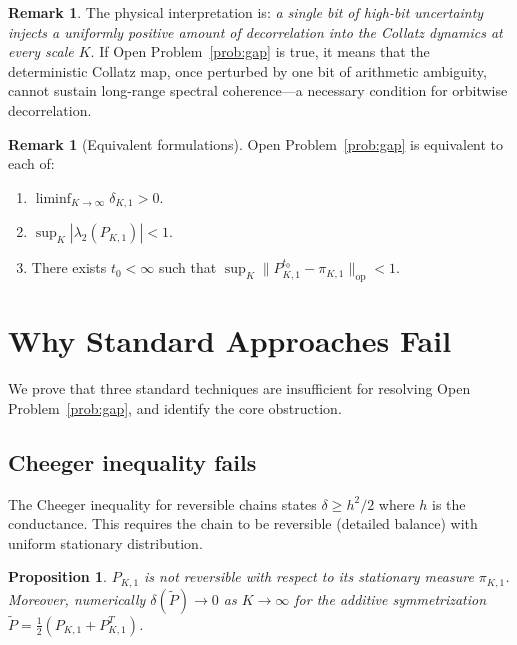 \documentclass[12pt]{article}
\newtheorem{proposition}[theorem]{Proposition}
\theoremstyle{definition}
\newtheorem{remark}[theorem]{Remark}
\newcommand{\PKone}{P_{K,1}}
\begin{document}
\begin{remark}
The physical interpretation is: \emph{a single bit of high-bit uncertainty injects a uniformly positive amount of decorrelation into the Collatz dynamics at every scale $K$}. If Open Problem~\ref{prob:gap} is true, it means that the deterministic Collatz map, once perturbed by one bit of arithmetic ambiguity, cannot sustain long-range spectral coherence---a necessary condition for orbitwise decorrelation.
\end{remark}

\begin{remark}[Equivalent formulations]
Open Problem~\ref{prob:gap} is equivalent to each of:
\begin{enumerate}
\item $\liminf_{K\to\infty} \delta_{K,1} > 0$.
\item $\sup_{K} |\lambda_2(\PKone)| < 1$.
\item There exists $t_0 < \infty$ such that $\sup_K \|\PKone^{t_0} - \pi_{K,1}\|_{\mathrm{op}} < 1$.
\end{enumerate}
\end{remark}

\section{Why Standard Approaches Fail}
\label{sec:negative}

We prove that three standard techniques are insufficient for resolving Open Problem~\ref{prob:gap}, and identify the core obstruction.

\subsection{Cheeger inequality fails}

The Cheeger inequality for reversible chains states $\delta \geq h^2/2$ where $h$ is the conductance. This requires the chain to be reversible (detailed balance) with uniform stationary distribution.

\begin{proposition}
$\PKone$ is not reversible with respect to its stationary measure $\pi_{K,1}$. Moreover, numerically $\delta(\tilde{P}) \to 0$ as $K \to \infty$ for the additive symmetrization $\tilde{P} = \frac{1}{2}(\PKone + \PKone^T)$.
\end{proposition}
\end{document}
